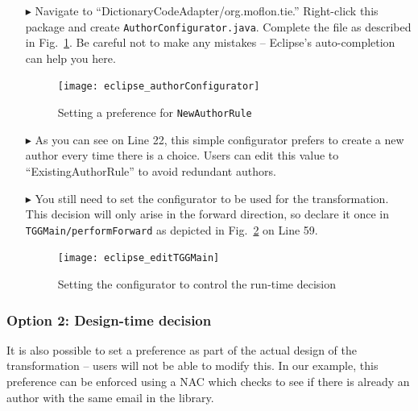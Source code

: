 \begin{itemize}

\item[$\blacktriangleright$] Navigate to ``DictionaryCodeAdapter/org.moflon.tie.'' Right-click this package and create
\texttt{Author\-Config\-ur\-at\-or.java}. Complete the file as described in Fig.~\ref{eclipse:authorConfig}. Be careful not to make any mistakes -- Eclipse's
auto-completion can help you here.

\begin{figure}[htbp]
\begin{center}
  \texttt{[image: eclipse\_authorConfigurator]}
  \caption{Setting a preference for \texttt{NewAuthorRule}}
  \label{eclipse:authorConfig}
\end{center}
\end{figure}

\clearpage

\item[$\blacktriangleright$] As you can see on Line 22, this simple configurator prefers to create a new author every time there is a choice. Users can
edit this value to ``ExistingAuthorRule'' to avoid redundant authors.

\item[$\blacktriangleright$] You still need to set the configurator to be used for the transformation. This decision will only arise in the forward
direction, so declare it once in \texttt{TGGMain/performForward} as depicted in Fig.~\ref{eclipse:editTGGMain} on Line 59.

\vspace{0.5cm}

\begin{figure}[htbp]
\begin{center}
  \texttt{[image: eclipse\_editTGGMain]}
  \caption{Setting the configurator to control the run-time decision \update}
  \label{eclipse:editTGGMain}
\end{center}
\end{figure}

\end{itemize}

\subsubsection{Option 2: Design-time decision}

It is also possible to set a preference as part of the actual design of the transformation -- users will not be able to modify this. In our example, this
preference can be enforced using a NAC which checks to see if there is already an author with the same email in the library.


